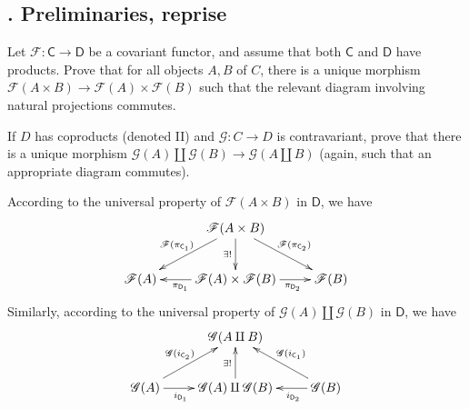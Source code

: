 \documentclass[12pt,letterpaper,boxed]{hmcpset}
\begin{document}
\subsection{. Preliminaries, reprise}
\begin{problem}[1.1]
Let $\mathscr{F}: \mathsf{C} \rightarrow \mathsf{D}$ be a covariant functor, and assume that both $\mathsf{C}$ and $\mathsf{D}$ have products. Prove that for all objects $A, B$ of $C$, there is a unique morphism $\mathscr{F}(A \times B) \rightarrow \mathscr{F}(A) \times \mathscr{F}(B)$ such that the relevant diagram involving natural projections commutes.

\hspace*{2em}If $D$ has coproducts (denoted II) and $\mathscr{G}: C \rightarrow D$ is contravariant, prove that there is a unique morphism $\mathscr{G}(A)\amalg\mathscr{G}(B) \rightarrow \mathscr{G}(A \amalg B)$ (again, such that an appropriate diagram commutes).
\end{problem}
\begin{solution}
	According to the universal property of $\mathscr{F}(A \times B)$ in $\mathsf{D}$, we have 
\[\xymatrix{
	&\mathscr{F}(A \times B)
	 \ar@{->}[d]_{\exists !}
	 \ar@{->}[rd]^{\mathscr{F}(\pi_{\mathsf{C}_2})}
	 \ar@{->}[ld]_{\mathscr{F}(\pi_{\mathsf{C}_1})}
	& \\
	 \mathscr{F}(A)
	&\mathscr{F}(A) \times \mathscr{F}(B)
	 \ar@{->}[l]^{\pi_{\mathsf{D}_1}\hspace{1.2em}}
	 \ar@{->}[r]_{\hspace{1.5em}\pi_{\mathsf{D}_2}}
	&\mathscr{F}(B)
}\]
Similarly, according to the universal property of $\mathscr{G}(A)\amalg\mathscr{G}(B)$ in $\mathsf{D}$, we have
\[\xymatrix{
	&\mathscr{G}(A \amalg B)        
	& \\
	 \mathscr{G}(A)
	 \ar@{->}[ru]^{\mathscr{G}(i_{\mathsf{C}_2})}
	 \ar@{->}[r]_{i_{\mathsf{D}_1}\hspace{1.5em}}
	&\mathscr{G}(A) \amalg \mathscr{G}(B)
	 \ar@{->}[u]^{\exists !}
	&\mathscr{G}(B)
	\ar@{->}[lu]_{\mathscr{G}(i_{\mathsf{C}_1})}
	\ar@{->}[l]^{\hspace{2em}i_{\mathsf{D}_2}}
}\]
\end{solution}
\end{document}
